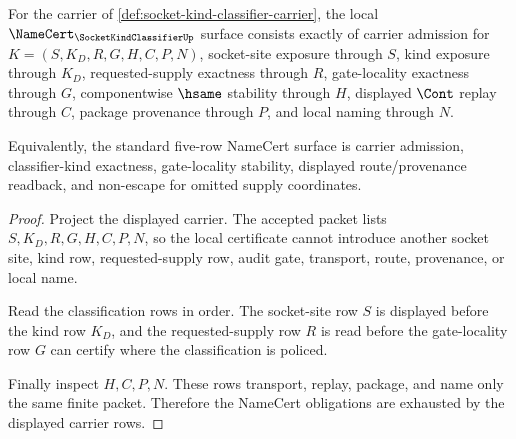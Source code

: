 
\begin{theorem}
\label{thm:socket-kind-classifier-namecert-obligations}
For the carrier of \autoref{def:socket-kind-classifier-carrier}, the local $\NameCert_{\SocketKindClassifierUp}$ surface consists exactly of carrier admission for $K=(S,K_D,R,G,H,C,P,N)$, socket-site exposure through $S$, kind exposure through $K_D$, requested-supply exactness through $R$, gate-locality exactness through $G$, componentwise $\hsame$ stability through $H$, displayed $\Cont$ replay through $C$, package provenance through $P$, and local naming through $N$.

Equivalently, the standard five-row NameCert surface is carrier admission, classifier-kind exactness, gate-locality stability, displayed route/provenance readback, and non-escape for omitted supply coordinates.
\end{theorem}
\begin{proof}
Project the displayed carrier. The accepted packet lists $S,K_D,R,G,H,C,P,N$, so the local certificate cannot introduce another socket site, kind row, requested-supply row, audit gate, transport, route, provenance, or local name.

Read the classification rows in order. The socket-site row $S$ is displayed before the kind row $K_D$, and the requested-supply row $R$ is read before the gate-locality row $G$ can certify where the classification is policed.

Finally inspect $H,C,P,N$. These rows transport, replay, package, and name only the same finite packet. Therefore the NameCert obligations are exhausted by the displayed carrier rows.
\end{proof}

